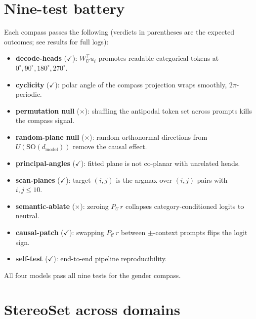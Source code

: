 \section{Nine-test battery}
\label{app:battery}

Each compass passes the following (verdicts in parentheses are the
expected outcomes; see results for full logs):
\begin{itemize}
    \item \textbf{decode-heads} ($\checkmark$): $W_U^{\top}u_i$
    promotes readable categorical tokens at $0^\circ, 90^\circ,
    180^\circ, 270^\circ$.
    \item \textbf{cyclicity} ($\checkmark$): polar angle of the
    compass projection wraps smoothly, $2\pi$-periodic.
    \item \textbf{permutation null} ($\times$): shuffling the
    antipodal token set across prompts kills the compass signal.
    \item \textbf{random-plane null} ($\times$): random orthonormal
    directions from $U(\mathrm{SO}(d_\text{model}))$ remove the
    causal effect.
    \item \textbf{principal-angles} ($\checkmark$): fitted plane is
    not co-planar with unrelated heads.
    \item \textbf{scan-planes} ($\checkmark$): target $(i, j)$ is
    the argmax over $(i, j)$ pairs with $i, j \le 10$.
    \item \textbf{semantic-ablate} ($\times$): zeroing
    $P_{\mathcal{C}}\,r$ collapses category-conditioned logits to
    neutral.
    \item \textbf{causal-patch} ($\checkmark$): swapping
    $P_{\mathcal{C}}\,r$ between $\pm$-context prompts flips the
    logit sign.
    \item \textbf{self-test} ($\checkmark$): end-to-end pipeline
    reproducibility.
\end{itemize}
All four models pass all nine tests for the gender compass.

\section{StereoSet across domains}
\label{app:stereoset}

